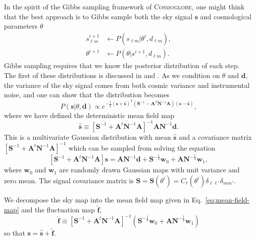 \documentclass[twocolumn]{../common/aa}
\newcommand{\cosmoglobe}{\textsc{Cosmoglobe}}
\begin{document}
In the spirit of the Gibbs sampling framework of \cosmoglobe, one might think that the best approach is to Gibbs sample both the sky signal $\mathbf{s}$ and cosmological parameters $\theta$
\begin{align}
    s_{\ell m}^{i+1} &\leftarrow P(s_{\ell m} | \theta^{i}, d_{\ell m}),\\
    \label{eq:theta-gibbs}
    \theta^{i+1} &\leftarrow P(\theta | s^{i+1}, d_{\ell m}).
\end{align}
Gibbs sampling requires that we know the posterior distribution of each step. The first of these distributions is discussed in \cite{jewell2004} and \cite{wandelt2004}. As we condition on $\theta$ and $\textbf{d}$, the variance of the sky signal comes from both cosmic variance and instrumental noise, and one can show that the distribution becomes
\begin{equation}
    P(\mathbf{s} | \theta, \mathbf{d}) \propto e^{-\frac12 \left(\mathbf{s} + \hat{\mathbf{s}}\right)^T \left(\mathbf{S}^{-1} - \mathbf{A}^T\mathbf{N}^{-1}\mathbf{A}\right) \left(\mathbf{s} - \hat{\mathbf{s}}\right)},
\end{equation}
where we have defined the deterministic mean field map
\begin{equation}
\label{eq:mean-field-map}
\hat{\textbf{s}} \equiv \left[\mathbf{S}^{-1} + \mathbf{A}^t \mathbf{N}^{-1}\mathbf{A} \right]^{-1} \mathbf{A} \mathbf{N}^{-1} \mathbf{d}.
\end{equation}
This is a multivariate Gaussian distribution with mean $\hat{\textbf{s}}$ and a covariance matrix $\left[\mathbf{S}^{-1} + \mathbf{A}^t \mathbf{N}^{-1}\mathbf{A} \right]^{-1}$ which can be sampled from solving the equation
\begin{equation}
    \label{eq:mapmakingeq}
    \left[\mathbf{S}^{-1} + \mathbf{A}^t \mathbf{N}^{-1}\mathbf{A} \right]\mathbf{s} = \mathbf{A} \mathbf{N}^{-1} \mathbf{d} + \mathbf{S}^{-\frac{1}{2}}\mathbf{w}_0 +\mathbf{A N}^{-\frac{1}{2}}\mathbf{w}_1,
\end{equation}
where $\mathbf{w}_0$ and $\mathbf{w}_1$ are randomly drawn Gaussian maps with unit variance and zero mean. The signal covariance matrix is $\mathbf{S} = \mathbf{S}(\theta^i) = C_{\ell}\left(\theta^i\right)\delta_{\ell \ell'}\delta_{mm'}$.

We decompose the sky map into the mean field map given in Eq.~\eqref{eq:mean-field-map} and the fluctuation map $\hat{\textbf{f}}$,
\begin{equation}
\label{eq:fluc-map}
\hat{\textbf{f}} \equiv \left[\mathbf{S}^{-1} + \mathbf{A}^t \mathbf{N}^{-1}\mathbf{A} \right]^{-1} \left(\mathbf{S}^{-\frac{1}{2}}\mathbf{w}_0 +\mathbf{A N}^{-\frac{1}{2}}\mathbf{w}_1 \right)
\end{equation}
so that $\mathbf{s} = \hat{\mathbf{s}} + \hat{\mathbf{f}}$.
\end{document}
